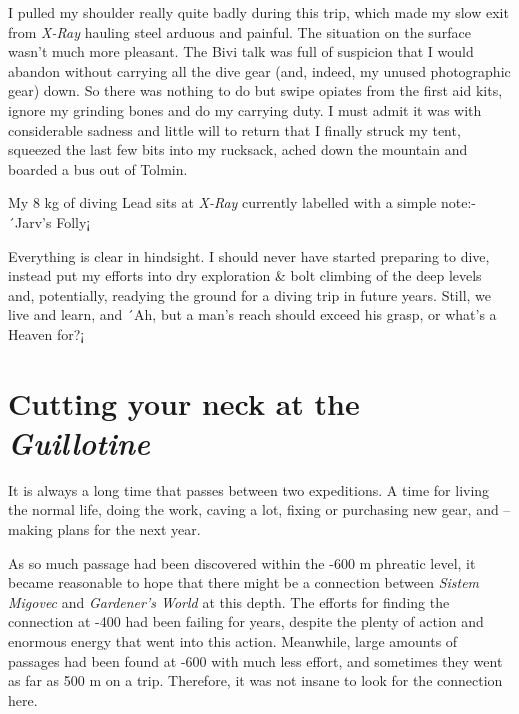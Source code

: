 I pulled my shoulder really quite badly during this trip, which made my
slow exit from \emph{X-Ray} hauling steel arduous and painful. The
situation on the surface wasn't much more pleasant. The Bivi talk was
full of suspicion that I would abandon without carrying all the dive
gear (and, indeed, my unused photographic gear) down. So there was
nothing to do but swipe opiates from the first aid kits, ignore my
grinding bones and do my carrying duty. I must admit it was with
considerable sadness and little will to return that I finally struck my
tent, squeezed the last few bits into my rucksack, ached down the
mountain and boarded a bus out of Tolmin.

My 8 kg of diving Lead sits at \emph{X-Ray} currently labelled with a
simple note:- ´Jarv's Folly¡

Everything is clear in hindsight. I should never have started preparing
to dive, instead put my efforts into dry exploration \& bolt climbing of
the deep levels and, potentially, readying the ground for a diving trip
in future years. Still, we live and learn, and ´Ah, but a man's reach
should exceed his grasp, or what's a Heaven for?¡


\hypertarget{cutting-your-neck-at-the-guillotine}{%
\section{\texorpdfstring{Cutting your neck at the
\emph{Guillotine}}{Cutting your neck at the Guillotine}}\label{cutting-your-neck-at-the-guillotine}}

It is always a long time that passes between two expeditions. A time for
living the normal life, doing the work, caving a lot, fixing or
purchasing new gear, and -- making plans for the next year.

As so much passage had been discovered within the -600 m phreatic level,
it became reasonable to hope that there might be a connection between
\emph{Sistem Migovec} and \emph{Gardener's World} at this depth. The
efforts for finding the connection at -400 had been failing for years,
despite the plenty of action and enormous energy that went into this
action. Meanwhile, large amounts of passages had been found at -600 with
much less effort, and sometimes they went as far as 500 m on a trip.
Therefore, it was not insane to look for the connection here.

